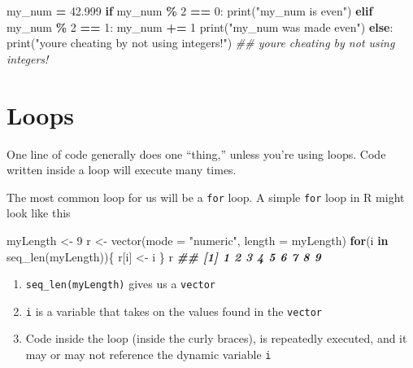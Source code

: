 \documentclass[
  12pt,
]{krantz}
\makeatletter
\newenvironment{Shaded}{\begin{snugshade}}{\end{snugshade}}
\newcommand{\AttributeTok}[1]{\textcolor[rgb]{0.61,0.61,0.61}{#1}}
\newcommand{\BuiltInTok}[1]{#1}
\newcommand{\CommentTok}[1]{\textcolor[rgb]{0.37,0.37,0.37}{\textit{#1}}}
\newcommand{\ControlFlowTok}[1]{\textcolor[rgb]{0.27,0.27,0.27}{\textbf{#1}}}
\newcommand{\DecValTok}[1]{\textcolor[rgb]{0.06,0.06,0.06}{#1}}
\newcommand{\DocumentationTok}[1]{\textcolor[rgb]{0.37,0.37,0.37}{\textbf{\textit{#1}}}}
\newcommand{\FloatTok}[1]{\textcolor[rgb]{0.06,0.06,0.06}{#1}}
\newcommand{\FunctionTok}[1]{\textcolor[rgb]{0,0,0}{#1}}
\newcommand{\NormalTok}[1]{#1}
\newcommand{\OperatorTok}[1]{\textcolor[rgb]{0.43,0.43,0.43}{\textbf{#1}}}
\newcommand{\OtherTok}[1]{\textcolor[rgb]{0.37,0.37,0.37}{#1}}
\newcommand{\StringTok}[1]{\textcolor[rgb]{0.5,0.5,0.5}{#1}}
\providecommand{\tightlist}{%
  \setlength{\itemsep}{0pt}\setlength{\parskip}{0pt}}
\newenvironment{kframe}{%
\medskip{}
\setlength{\fboxsep}{.8em}
 \def\at@end@of@kframe{}%
 \ifinner\ifhmode%
  \def\at@end@of@kframe{\end{minipage}}%
  \begin{minipage}{\columnwidth}%
 \fi\fi%
 \def\FrameCommand##1{\hskip\@totalleftmargin \hskip-\fboxsep
 \colorbox{shadecolor}{##1}\hskip-\fboxsep
     \hskip-\linewidth \hskip-\@totalleftmargin \hskip\columnwidth}%
 \MakeFramed {\advance\hsize-\width
   \@totalleftmargin\z@ \linewidth\hsize
   \@setminipage}}%
 {\par\unskip\endMakeFramed%
 \at@end@of@kframe}
\renewenvironment{Shaded}{\begin{kframe}}{\end{kframe}}
\makeatother
\begin{document}
\begin{Shaded}
\begin{Highlighting}[]
\NormalTok{my\_num }\OperatorTok{=} \FloatTok{42.999}
\ControlFlowTok{if}\NormalTok{ my\_num }\OperatorTok{\%} \DecValTok{2} \OperatorTok{==} \DecValTok{0}\NormalTok{:}
    \BuiltInTok{print}\NormalTok{(}\StringTok{"my\_num is even"}\NormalTok{)}
\ControlFlowTok{elif}\NormalTok{ my\_num }\OperatorTok{\%} \DecValTok{2} \OperatorTok{==} \DecValTok{1}\NormalTok{:}
\NormalTok{    my\_num }\OperatorTok{+=} \DecValTok{1}
    \BuiltInTok{print}\NormalTok{(}\StringTok{"my\_num was made even"}\NormalTok{)}
\ControlFlowTok{else}\NormalTok{:}
    \BuiltInTok{print}\NormalTok{(}\StringTok{"you\textquotesingle{}re cheating by not using integers!"}\NormalTok{)}
\CommentTok{\#\# you\textquotesingle{}re cheating by not using integers!}
\end{Highlighting}
\end{Shaded}

\hypertarget{loops}{%
\section{Loops}\label{loops}}

One line of code generally does one ``thing,'' unless you're using loops. Code written inside a loop will execute many times.

The most common loop for us will be a \texttt{for} loop. A simple \texttt{for} loop in R might look like this

\begin{Shaded}
\begin{Highlighting}[]
\NormalTok{myLength }\OtherTok{\textless{}{-}} \DecValTok{9}
\NormalTok{r }\OtherTok{\textless{}{-}} \FunctionTok{vector}\NormalTok{(}\AttributeTok{mode =} \StringTok{"numeric"}\NormalTok{, }\AttributeTok{length =}\NormalTok{ myLength)}
\ControlFlowTok{for}\NormalTok{(i }\ControlFlowTok{in} \FunctionTok{seq\_len}\NormalTok{(myLength))\{}
\NormalTok{    r[i] }\OtherTok{\textless{}{-}}\NormalTok{ i}
\NormalTok{\}}
\NormalTok{r}
\DocumentationTok{\#\# [1] 1 2 3 4 5 6 7 8 9}
\end{Highlighting}
\end{Shaded}

\begin{enumerate}
\def\labelenumi{\arabic{enumi}.}
\tightlist
\item
  \texttt{seq\_len(myLength)} gives us a \texttt{vector}
\item
  \texttt{i} is a variable that takes on the values found in the \texttt{vector}
\item
  Code inside the loop (inside the curly braces), is repeatedly executed, and it may or may not reference the dynamic variable \texttt{i}
\end{enumerate}
\end{document}
